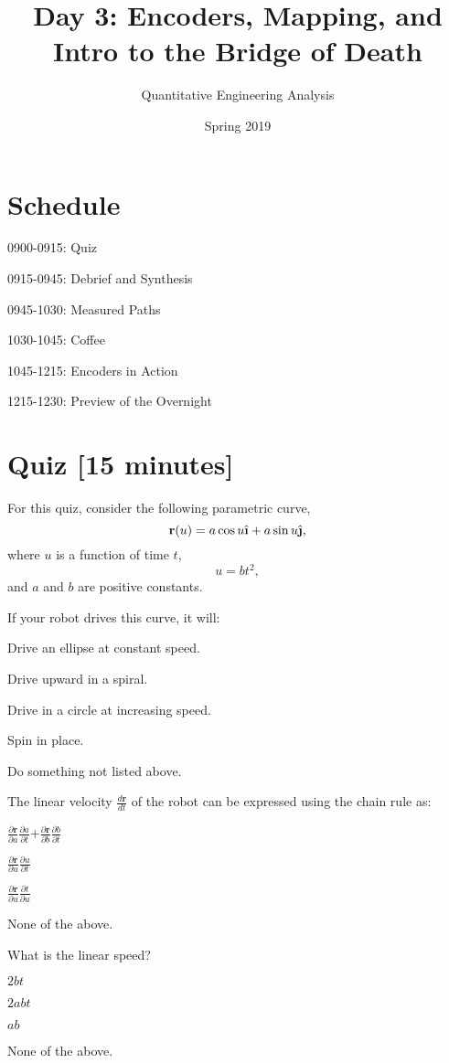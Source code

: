 \documentclass{tufte-handout}
\title{Day 3: Encoders, Mapping, and Intro to the Bridge of Death}
\author{Quantitative Engineering Analysis}
\date{Spring 2019}
\begin{document}
\maketitle
\thispagestyle{firstpage}

\section{Schedule}
\bi
\item 0900-0915: Quiz
\item 0915-0945: Debrief and Synthesis
\item 0945-1030: Measured Paths
\item 1030-1045: Coffee
\item 1045-1215: Encoders in Action
\item 1215-1230: Preview of the Overnight
\ei

\section{Quiz [15 minutes]}

For this quiz, consider the following parametric curve,
\[ \r(u)= a \cos u \ihat + a \sin u \jhat, \] 
where $u$ is a function of time $t$,
\[ u=b t^2, \]
and $a$ and $b$ are positive constants.

\be
\item If your robot drives this curve, it will:
\be
\item Drive an ellipse at constant speed.
\item Drive upward in a spiral.
\item Drive in a circle at increasing speed.
\item Spin in place.
\item Do something not listed above.
\ee

\item The linear velocity $\frac{d {\mathbf r}}{dt}$ of the robot can be expressed using the chain rule as:
\be
\item $\frac{\partial {\mathbf r}}{\partial a}\frac{\partial a}{\partial t}$+$\frac{\partial {\mathbf r}}{\partial b}\frac{\partial b}{\partial t}$
\item $\frac{\partial {\mathbf r}}{\partial u}\frac{\partial u}{\partial t}$
\item $\frac{\partial {\mathbf r}}{\partial u}\frac{\partial t}{\partial u}$
\item None of the above.

\ee
\item What is the linear speed?
\be
\item $2bt$
\item $2abt$
\item $ab$
\item None of the above.
\ee
\end{document}
